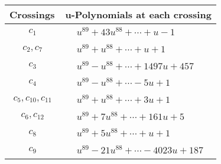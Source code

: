 \documentclass[1p]{elsarticle_modified}
\theoremstyle{definition}
\begin{document}
\begin{tabular}{m{50pt}|m{274pt}}
Crossings & \hspace{64pt}u-Polynomials at each crossing \\
\hline $$\begin{aligned}c_{1}\end{aligned}$$&$\begin{aligned}
&u^{89}+43 u^{88}+\cdots+u-1
\end{aligned}$\\
\hline $$\begin{aligned}c_{2},c_{7}\end{aligned}$$&$\begin{aligned}
&u^{89}+u^{88}+\cdots+u+1
\end{aligned}$\\
\hline $$\begin{aligned}c_{3}\end{aligned}$$&$\begin{aligned}
&u^{89}- u^{88}+\cdots+1497 u+457
\end{aligned}$\\
\hline $$\begin{aligned}c_{4}\end{aligned}$$&$\begin{aligned}
&u^{89}- u^{88}+\cdots-5 u+1
\end{aligned}$\\
\hline $$\begin{aligned}c_{5},c_{10},c_{11}\end{aligned}$$&$\begin{aligned}
&u^{89}+u^{88}+\cdots+3 u+1
\end{aligned}$\\
\hline $$\begin{aligned}c_{6},c_{12}\end{aligned}$$&$\begin{aligned}
&u^{89}+7 u^{88}+\cdots+161 u+5
\end{aligned}$\\
\hline $$\begin{aligned}c_{8}\end{aligned}$$&$\begin{aligned}
&u^{89}+5 u^{88}+\cdots+u+1
\end{aligned}$\\
\hline $$\begin{aligned}c_{9}\end{aligned}$$&$\begin{aligned}
&u^{89}-21 u^{88}+\cdots-4023 u+187
\end{aligned}$\\
\hline
\end{tabular}\newpage\renewcommand{\arraystretch}{1}
\end{document}
